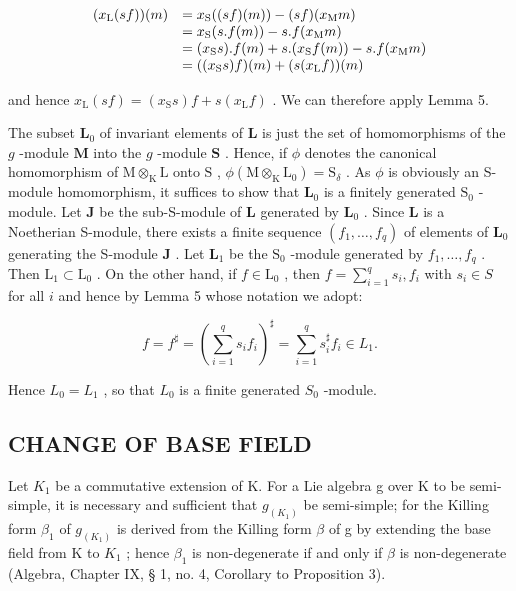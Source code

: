 \[
\begin{array}{r l} (x _ {\mathrm{L}} (s f)) (m) & = x _ {\mathrm{S}} ((s f) (m)) - (s f) (x _ {\mathrm{M}} m) \\ & = x _ {\mathrm{S}} (s. f (m)) - s. f (x _ {\mathrm{M}} m) \\ & = (x _ {\mathrm{S}} s). f (m) + s. (x _ {\mathrm{S}} f (m)) - s. f (x _ {\mathrm{M}} m) \\ & = ((x _ {\mathrm{S}} s) f) (m) + (s (x _ {\mathrm{L}} f)) (m) \end{array}
\]

and hence \(x_{\mathrm{L}}(sf) = (x_{\mathrm{S}}s)f + s(x_{\mathrm{L}}f)\) . We can therefore apply Lemma 5.

The subset \(\mathbf{L}_0\) of invariant elements of \(\mathbf{L}\) is just the set of homomorphisms of the \(g\) -module \(\mathbf{M}\) into the \(g\) -module \(\mathbf{S}\) . Hence, if \(\phi\) denotes the canonical homomorphism of \(\mathrm{M} \otimes_{\mathrm{K}} \mathrm{L}\) onto \(\mathrm{S}\) , \(\phi(\mathrm{M} \otimes_{\mathrm{K}} \mathrm{L}_0) = \mathrm{S}_{\delta}\) . As \(\phi\) is obviously an S-module homomorphism, it suffices to show that \(\mathbf{L}_0\) is a finitely generated \(\mathrm{S}_0\) -module. Let \(\mathbf{J}\) be the sub-S-module of \(\mathbf{L}\) generated by \(\mathbf{L}_0\) . Since \(\mathbf{L}\) is a Noetherian S-module, there exists a finite sequence \((f_1, \ldots, f_q)\) of elements of \(\mathbf{L}_0\) generating the S-module \(\mathbf{J}\) . Let \(\mathbf{L}_1\) be the \(\mathrm{S}_0\) -module generated by \(f_{1},\ldots ,f_{q}\) . Then \(\mathrm{L}_1\subset \mathrm{L}_0\) . On the other hand, if \(f\in \mathrm{L}_0\) , then \(f = \sum_{i = 1}^{q}s_{i},f_{i}\) with \(s_i\in S\) for all \(i\) and hence by Lemma 5 whose notation we adopt:

\[
f = f ^ {\sharp} = \left(\sum_ {i = 1} ^ {q} s _ {i} f _ {i}\right) ^ {\sharp} = \sum_ {i = 1} ^ {q} s _ {i} ^ {\sharp} f _ {i} \in L _ {1}.
\]

Hence \(L_{0} = L_{1}\) , so that \(L_{0}\) is a finite generated \(S_{0}\) -module.

\subsection{CHANGE OF BASE FIELD}

Let \(K_{1}\) be a commutative extension of K. For a Lie algebra g over K to be semi-simple, it is necessary and sufficient that \(g_{(K_{1})}\) be semi-simple; for the Killing form \(\beta_{1}\) of \(g_{(K_{1})}\) is derived from the Killing form \(\beta\) of g by extending the base field from K to \(K_{1}\) ; hence \(\beta_{1}\) is non-degenerate if and only if \(\beta\) is non-degenerate (Algebra, Chapter IX, § 1, no. 4, Corollary to Proposition 3).

